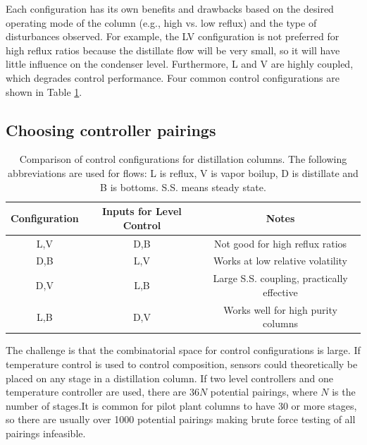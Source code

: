 Each configuration has its own benefits and drawbacks based on the desired operating mode of the column (e.g., high vs. low reflux) and the type of disturbances observed. For example, the LV configuration is not preferred for high reflux ratios because the distillate flow will be very small, so it will have little influence on the condenser level.\citep{Skogestad2007} Furthermore, L and V are highly coupled, which degrades control performance.\citep{Riggs2006} Four common  control  configurations are shown in Table \ref{table:distillation_configurations}.

\subsection{Choosing controller pairings} 
\begin{table}[t]
	\centering
	\caption{Comparison of control configurations for distillation columns. The following abbreviations are used for flows: L is reflux, V is vapor boilup, D is distillate and B is bottoms. S.S. means steady state.}
	\label{table:distillation_configurations}
		\begin{tabular}{ c c c }
			Configuration & Inputs for Level Control & Notes\\
			\hline
			L,V & D,B & Not good for high reflux ratios\citep{Skogestad2007}   \\
			D,B & L,V & Works at low relative volatility\citep{Finco1989} \\
			D,V & L,B & Large S.S. coupling, practically effective\citep{Riggs2006} \\
			L,B & D,V & Works well for high purity columns\citep{Skogestad2007} \\
		\end{tabular}
\end{table}
 The challenge is that the combinatorial space for control configurations is large.\citep{Shinskey1984} If temperature control is used to control composition, sensors could theoretically be placed on any stage in a distillation column. If two level controllers and one temperature controller are used, there are $36N$ potential pairings, where $N$ is the number of stages.\footnotemark It is common for pilot plant columns to have 30 or more stages, so there are usually over 1000 potential pairings making brute force testing of all pairings infeasible.

